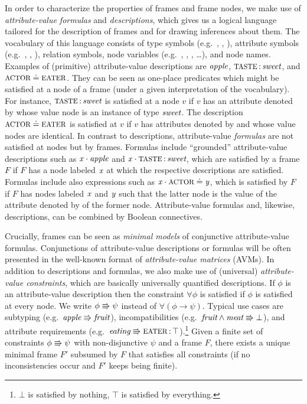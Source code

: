 \documentclass[output=paper,colorlinks,citecolor=brown,chinesefont]{langscibook}
\begin{document}
In order to characterize the properties of frames and frame nodes, we make use of \emph{attribute-value formulas} and \emph{descriptions}, which gives us a logical language tailored for the description of frames and for drawing inferences about them.
The vocabulary of this language consists of type symbols (e.g.\ , , ), attribute symbols (e.g.\ , , ), relation symbols, node variables (e.g.\ , , , \dots), and node names.
Examples of (primitive) attribute-value descriptions are $\textit{apple}$, $\feat{taste}\D\type{sweet}$, and $\feat{actor}\patheq\feat{eater}$.
They can be seen as one-place predicates which might be satisfied at a node of a frame (under a given interpretation of the vocabulary).
For instance, $\feat{taste}\D\type{sweet}$ is satisfied at a node $v$ if $v$ has an attribute denoted by  whose value node is an instance of type $\textit{sweet}$.
The description $\feat{actor}\patheq\feat{eater}$ is satisfied at $v$ if $v$ has attributes denoted by  and  whose value nodes are identical.
In contrast to descriptions, attribute-value \emph{formulas} are not satisfied at nodes but by frames.
Formulas include ``grounded'' attribute-value descriptions such as $\textit{x\/}\cdot\textit{apple}$ and $\xvar{x}\cdot\feat{taste}\D\type{sweet}$, which are satisfied by a frame $F$ if $F$ has a node labeled $\textit{x\/}$ at which the respective descriptions are satisfied.
Formulas include also expressions such as $\xvar{x}\cdot\feat{actor}\valeq\xvar{y}$, which is satisfied by $F$ if $F$ has nodes labeled $\textit{x\/}$ and $\textit{y\/}$ such that the latter node is the value of the attribute denoted by  of the former node. 
Attribute-value formulas and, likewise, descriptions, can be combined by Boolean connectives.

Crucially, frames can be seen as \emph{minimal models} of conjunctive attribute-value formulas.
Conjunctions of attribute-value descriptions or formulas will be often presented in the well-known format of \emph{attribute-value matrices} (AVMs).
In addition to descriptions and formulas, we also make use of (universal) \emph{attribute-value constraints}, which are basically universally quantified descriptions.
If $\phi$ is an attribute-value description then the constraint $\forall\phi$ is satisfied if $\phi$ is satisfied at every node.
We write $\phi\Rrightarrow\psi$ instead of $\forall(\phi\to\psi)$.
Typical use cases are subtyping (e.g.\ $\textit{apple}\Rrightarrow\textit{fruit}$), incompatibilities (e.g.\ $\textit{fruit}\wedge\textit{meat}\Rrightarrow\bot$), and attribute requirements (e.g.\ $\type{eating}\implic\feat{eater}\D\top$).\footnote{$\bot$ is satisfied by nothing, $\top$ is satisfied by everything.}
Given a finite set of constraints $\phi\Rrightarrow\psi$ with non-disjunctive $\psi$ and a frame $F$, there exists a unique minimal frame $F'$ subsumed by $F$ that satisfies all constraints (if no inconsistencies occur and $F'$ keeps being finite).
\end{document}
